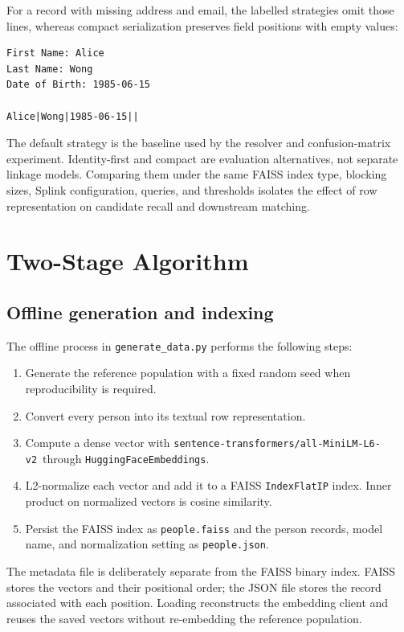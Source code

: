 \documentclass[11pt]{article}
\begin{document}
For a record with missing address and email, the labelled strategies omit those lines, whereas compact serialization preserves field positions with empty values:

\begin{verbatim}
First Name: Alice
Last Name: Wong
Date of Birth: 1985-06-15

Alice|Wong|1985-06-15||
\end{verbatim}

The default strategy is the baseline used by the resolver and confusion-matrix experiment. Identity-first and compact are evaluation alternatives, not separate linkage models. Comparing them under the same FAISS index type, blocking sizes, Splink configuration, queries, and thresholds isolates the effect of row representation on candidate recall and downstream matching.

\section{Two-Stage Algorithm}
\subsection{Offline generation and indexing}
The offline process in \texttt{generate\_data.py} performs the following steps:
\begin{enumerate}[leftmargin=*]
  \item Generate the reference population with a fixed random seed when reproducibility is required.
  \item Convert every person into its textual row representation.
  \item Compute a dense vector with {\footnotesize\texttt{sentence-transformers/all-MiniLM-L6-v2}\allowbreak\ through \texttt{HuggingFaceEmbeddings}\kern-0.4pt}.
  \item L2-normalize each vector and add it to a FAISS \texttt{IndexFlatIP} index. Inner product on normalized vectors is cosine similarity.
  \item Persist the FAISS index as \texttt{people.faiss} and the person records, model name, and normalization setting as \texttt{people.json}.
\end{enumerate}

The metadata file is deliberately separate from the FAISS binary index. FAISS stores the vectors and their positional order; the JSON file stores the record associated with each position. Loading reconstructs the embedding client and reuses the saved vectors without re-embedding the reference population.
\end{document}
